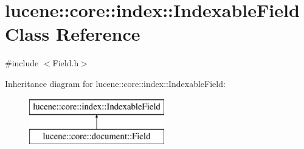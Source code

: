 \hypertarget{classlucene_1_1core_1_1index_1_1IndexableField}{}\section{lucene\+:\+:core\+:\+:index\+:\+:Indexable\+Field Class Reference}
\label{classlucene_1_1core_1_1index_1_1IndexableField}


{\ttfamily \#include $<$Field.\+h$>$}

Inheritance diagram for lucene\+:\+:core\+:\+:index\+:\+:Indexable\+Field\+:\begin{figure}[H]
\begin{center}
\leavevmode
\includegraphics[height=2.000000cm]{classlucene_1_1core_1_1index_1_1IndexableField}
\end{center}
\end{figure}
